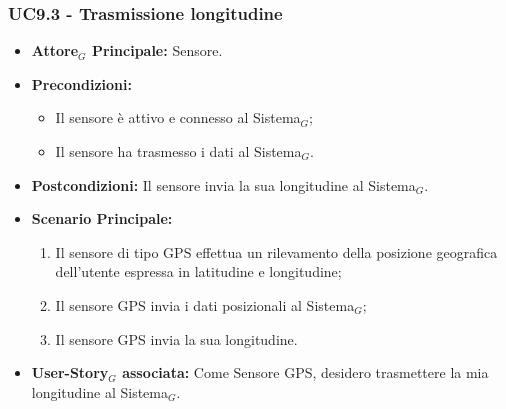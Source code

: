 \documentclass[10pt]{article}
\begin{document}
\begin{justify}
\subsubsection{\textbf{UC9.3 - Trasmissione longitudine}}
\begin{itemize}
    \item \textbf{Attore$_G$ Principale:} Sensore.
    \item \textbf{Precondizioni:} 
        \begin{itemize}
    	\item Il sensore è attivo e connesso al Sistema$_G$;
          \item Il sensore ha trasmesso i dati al Sistema$_G$.
        \end{itemize}
    \item \textbf{Postcondizioni:} Il sensore invia la sua longitudine al Sistema$_G$.
    \item \textbf{Scenario Principale:} 
        \begin{enumerate}
            \item Il sensore di tipo GPS effettua un rilevamento della posizione geografica dell'utente espressa in latitudine e longitudine;
            \item Il sensore GPS invia i dati posizionali al Sistema$_G$;
            \item Il sensore GPS invia la sua longitudine.
        \end{enumerate}
    \item \textbf{User-Story$_G$ associata:} Come Sensore GPS, desidero trasmettere la mia longitudine al Sistema$_G$.
\end{itemize}



\end{justify}
\end{document}
